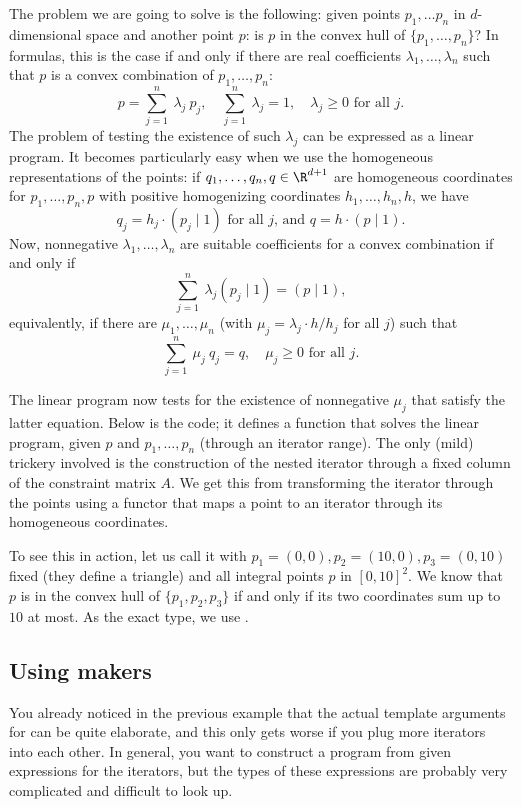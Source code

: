 The problem we are going to solve is the following: given points
$p_1,\ldots p_{n}$ in $d$-dimensional space and another point $p$: is
$p$ in the convex hull of $\{p_1,\ldots,p_{n}\}$? In formulas, this is
the case if and only if there are real coefficients
$\lambda_1,\ldots,\lambda_n$ such that $p$ is a convex combination of
$p_1,\ldots,p_n$: 
\[
p = \sum_{j=1}^{n}~\lambda_j~p_j, \quad \sum_{j=1}^{n}~\lambda_j = 1,
\quad \lambda_j \geq 0 \mbox{~for all $j$.}
\]
The problem of testing the existence of such $\lambda_j$ can 
be expressed as a linear program. It becomes particularly easy
when we use the homogeneous representations of the points: if
$q_1,\ldots,q_n,q\in\R^{d+1}$ are homogeneous coordinates for
$p_1,\ldots,p_n,p$ with positive homogenizing coordinates 
$h_1,\ldots,h_n,h$, we have
\[q_j = h_j \cdot (p_j \mid 1) \mbox{~for all $j$, and~} q = h \cdot
(p\mid 1).\] Now, nonnegative $\lambda_1,\ldots,\lambda_n$ are
suitable coefficients for a convex combination if and only if
\[\sum_{j=1}^n~ \lambda_j(p_j \mid 1) = (p\mid 1), \]
equivalently, if there are $\mu_1,\ldots,\mu_n$ 
(with $\mu_j = \lambda_j \cdot h/{h_j}$ for all $j$) such that
\[
\sum_{j=1}^n~\mu_j~q_j = q, \quad \mu_j \geq 0\mbox{~for all $j$}.
\]

The linear program now tests for the existence of nonnegative $\mu_j$
that satisfy the latter equation. Below is the code; it defines a
function that solves the linear program, given $p$ and
$p_1,\ldots,p_n$ (through an iterator range). The only (mild)
trickery involved is the construction of the nested iterator 
through a fixed column of the constraint matrix $A$. We get this
from transforming the iterator through the points using a functor 
that maps a point to an iterator through its homogeneous coordinates.


To see this in action, let us call it with $p_1=(0,0), p_2=(10,0),
p_3=(0,10)$ fixed (they define a triangle) and all integral points $p$
in $[0,10]^2$. We know that $p$ is in the convex hull of
$\{p_1,p_2,p_3\}$ if and only if its two coordinates sum up to $10$ at
most. As the exact type, we use .


\subsection{Using makers\label{sec:QP-makers}}
You already noticed in the previous example that the actual 
template arguments for 
can be quite elaborate, and this only gets worse if you plug more 
iterators into each other. In general, you want to construct a 
program from given expressions for the iterators, but the
types of these expressions are probably very complicated and 
difficult to look up. 

